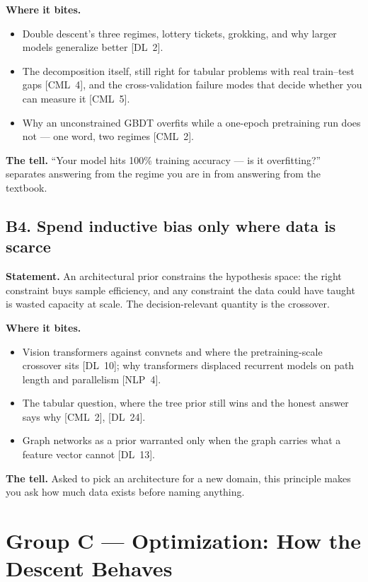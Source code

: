 \textbf{Where it bites.}
\begin{itemize}[itemsep=1pt,topsep=2pt,leftmargin=1.3em]
\item Double descent's three regimes, lottery tickets, grokking, and why larger models generalize better [DL~2].
\item The decomposition itself, still right for tabular problems with real train--test gaps [CML~4], and the cross-validation failure modes that decide whether you can measure it [CML~5].
\item Why an unconstrained GBDT overfits while a one-epoch pretraining run does not --- one word, two regimes [CML~2].
\end{itemize}

\textbf{The tell.} ``Your model hits 100\% training accuracy --- is it overfitting?'' separates answering from the regime you are in from answering from the textbook.

\subsection*{B4. Spend inductive bias only where data is scarce}

\textbf{Statement.} An architectural prior constrains the hypothesis space: the right constraint buys sample efficiency, and any constraint the data could have taught is wasted capacity at scale. The decision-relevant quantity is the crossover.

\textbf{Where it bites.}
\begin{itemize}[itemsep=1pt,topsep=2pt,leftmargin=1.3em]
\item Vision transformers against convnets and where the pretraining-scale crossover sits [DL~10]; why transformers displaced recurrent models on path length and parallelism [NLP~4].
\item The tabular question, where the tree prior still wins and the honest answer says why [CML~2], [DL~24].
\item Graph networks as a prior warranted only when the graph carries what a feature vector cannot [DL~13].
\end{itemize}

\textbf{The tell.} Asked to pick an architecture for a new domain, this principle makes you ask how much data exists before naming anything.

\section*{Group C --- Optimization: How the Descent Behaves}

